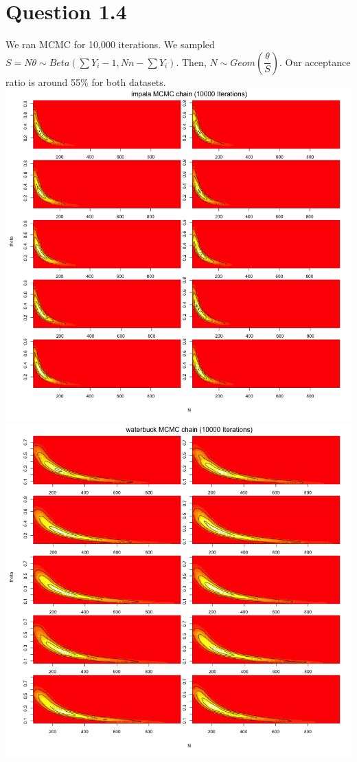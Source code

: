 \documentclass[10pt]{article}
\begin{document}
\section{Question 1.4}
We ran MCMC for 10,000 iterations. We sampled $S=N\theta\sim Beta(\sum Y_i-1, Nn-\sum Y_i)$. Then, $N\sim Geom(\dfrac{\theta}{S})$. Our acceptance ratio is around 55\% for both datasets.\\
\includegraphics[scale=0.65]{impalamcmc.png}\\



\includegraphics[scale=0.65]{waterbuckmcmc.png}\\
\end{document}

